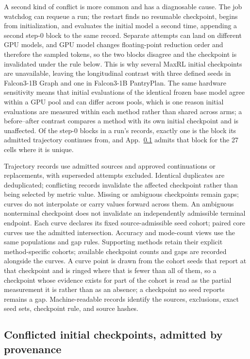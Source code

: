 \documentclass{article}
\newcommand{\1}{\mathbf 1}
\theoremstyle{remark}
\theoremstyle{definition}
\theoremstyle{plain}
\begin{document}
A second kind of conflict is more common and has a diagnosable cause. The job
watchdog can requeue a run; the restart finds no resumable checkpoint, begins
from initialization, and evaluates the initial model a second time, appending a
second step-0 block to the same record. Separate attempts can land on different
GPU models, and GPU model changes floating-point reduction order and therefore
the sampled tokens, so the two blocks disagree and the checkpoint is invalidated
under the rule below. This is why several MaxRL initial checkpoints are
unavailable, leaving the longitudinal contrast with three defined seeds in
Falcon3-1B Graph and one in Falcon3-1B PantryPlan. The same hardware
sensitivity means that initial evaluations of the identical frozen base model
agree within a GPU pool and can differ across pools, which is one reason
initial evaluations are measured within each method rather than shared across
arms; a before--after contrast compares a method with its own initial
checkpoint and is unaffected. Of the step-0 blocks in a run's records, exactly one is the block its admitted
trajectory continues from, and App.~\ref{app:initial-provenance} admits that
block for the 27 cells where it is unique.

Trajectory records use admitted sources and approved continuations or
replacements, with superseded attempts excluded. Identical duplicates are
deduplicated; conflicting records invalidate the affected checkpoint rather
than being selected by metric value. Missing or ambiguous checkpoints remain gaps;
curves do not interpolate or carry values forward across them. An ambiguous
nonterminal checkpoint does not invalidate an independently admissible
terminal endpoint. Each curve declares its fixed source-admissible seed cohort; paired core
curves use the admitted intersection. Accuracy and mode-count views use
the same populations and gap rules. Supporting methods retain their
explicit method-specific cohorts; available checkpoint counts and gaps
are recorded alongside the curves. A curve point is drawn from the cohort seeds
that report at that checkpoint and is ringed where that is fewer than all of
them, so a checkpoint whose evidence exists for part of the cohort is read as
the partial measurement it is rather than as an absence; a checkpoint no seed
reports remains a gap. Machine-readable records identify the
sources, exclusions, exact seed sets, checkpoint rule, and source hashes.

\subsection{Conflicted initial checkpoints, admitted by provenance}
\label{app:initial-provenance}
\end{document}
